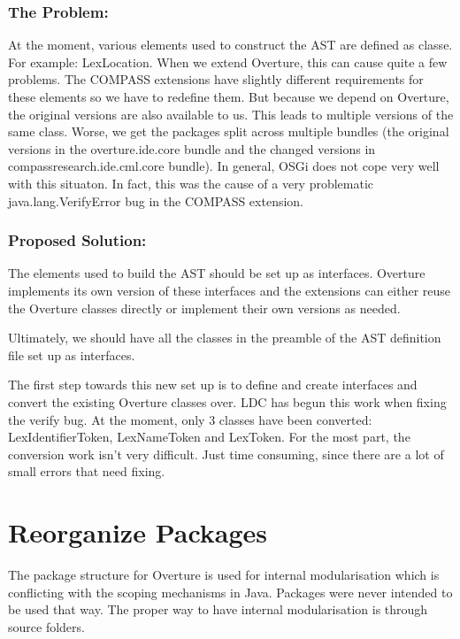 \documentclass[11pt]{overturerep} \usepackage{t1enc,times,a4,t1enc}
\begin{document}
    \subsubsection{The Problem:}

    At the moment, various elements used to construct the AST are defined as
    classe. For example: \textsf{LexLocation}. When we extend Overture, this
    can cause quite a few problems. The COMPASS extensions have slightly
    different requirements for these elements so we have to redefine them. But
    because we depend on Overture, the original versions are also available to
    us. This leads to multiple versions of the same class. Worse, we get the
    packages split across multiple bundles (the original versions in the
    overture.ide.core bundle and the changed versions in
    compassresearch.ide.cml.core bundle). In general, OSGi does not cope very
    well with this situaton. In fact, this was the cause of a very problematic
    \textsf{java.lang.VerifyError} bug in the COMPASS extension.




    \subsubsection{Proposed Solution:}
    
    The elements used to build the AST should be set up as interfaces. Overture
    implements its own version of these interfaces and the extensions can
    either reuse the Overture classes directly or implement their own versions
    as needed.

    Ultimately, we should have all the classes in the preamble of the AST
    definition file set up as interfaces.

    The first step towards this new set up is to define and create interfaces
    and convert the existing Overture classes over. LDC has begun this work
    when fixing the verify bug. At the moment, only 3 classes have been
    converted: \textsf{LexIdentifierToken}, \textsf{LexNameToken} and
    \textsf{LexToken}. For the most part, the conversion work isn't very
    difficult. Just time consuming, since there are a lot of small errors that
    need fixing.
    
    



\section{Reorganize Packages} The package structure for Overture is used for
internal modularisation which is conflicting with the scoping mechanisms in
Java.  Packages were never intended to be used that way. The proper way to have
internal modularisation is through source folders.
\end{document}
